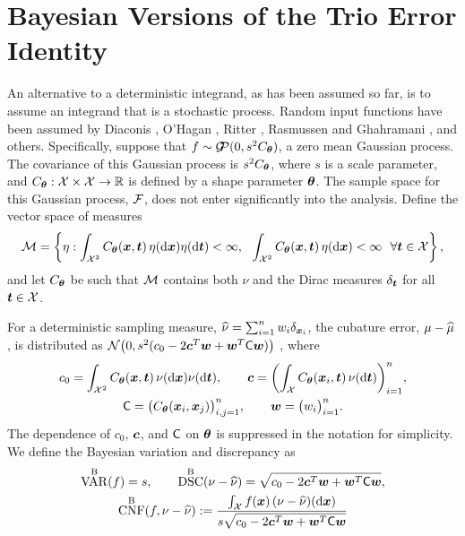 \documentclass[graybox,footinfo]{svmult}
\DeclareMathOperator{\algn}{CNF}
\DeclareMathOperator{\disc}{DSC}
\DeclareMathOperator{\Var}{VAR}
\DeclareMathOperator{\GP}{\cg\!\!\cp}
\begin{document}
\section{Bayesian Versions of the Trio Error Identity}
An alternative to a deterministic integrand, as has been assumed so far, is to assume an 
integrand that is a stochastic process.  Random input functions have been assumed by 
Diaconis \cite{Dia88a}, O'Hagan \cite{OHa91a}, Ritter \cite{Rit00a}, Rasmussen and 
Ghahramani \cite{RasGha03a}, and others. Specifically, suppose that $f \sim \GP (0, 
s^2C_{\bstheta})$, a zero mean Gaussian process.  The covariance of 
this  Gaussian process is $s^2C_{{\boldsymbol{\theta}}}$, where $s$ is a scale parameter, and 
$C_{{\boldsymbol{\theta}}}:\mathcal{X} \times \mathcal{X} \to {\mathbb{R}}$ is defined by a shape parameter ${\boldsymbol{\theta}}$.  The 
sample space for this Gaussian process, ${\mathcal{F}}$, does not enter significantly into the 
analysis.  Define the vector space of measures 
\begin{equation*}
\mathcal{M} = \left\{\eta :  \int_{{\mathcal{X}}^2} C_{\boldsymbol{\theta}}({\boldsymbol{x}},{\boldsymbol{t}}) 
\, \eta(\mathrm{d} {\boldsymbol{x}}) \eta(\mathrm{d} {\boldsymbol{t}}) < \infty, \ \ \int_{{\mathcal{X}}^2} C_{\boldsymbol{\theta}}({\boldsymbol{x}},{\boldsymbol{t}}) 
\, \eta(\mathrm{d} {\boldsymbol{x}}) < \infty \ \ \forall {\boldsymbol{t}} \in \mathcal{X} \right \},
\end{equation*}
and let $C_{{\boldsymbol{\theta}}}$ be such that $\mathcal{M}$ contains both $\nu$ and the Dirac measures 
$\delta_{{\boldsymbol{t}}}$ for all ${\boldsymbol{t}} \in \mathcal{X}$. 

For a 
deterministic sampling measure, $\widehat{\nu} = \sum_{i=1}^n w_i \delta_{{\boldsymbol{x}}_i}$, the cubature 
error, $\mu - \widehat{\mu}$, is distributed as $\mathcal{N} \bigl(0 , s^2(c_0 - 
2 {\boldsymbol{c}}^T {\boldsymbol{w}} + {\boldsymbol{w}} ^T \mathsf{C} {\boldsymbol{w}}) \bigr)$ \cite{??}, where 
\begin{gather*}
c_0  = \int_{{\mathcal{X}}^2} C_{\boldsymbol{\theta}}({\boldsymbol{x}},{\boldsymbol{t}}) \, \nu(\mathrm{d} {\boldsymbol{x}}) \nu(\mathrm{d} {\boldsymbol{t}}), \qquad {\boldsymbol{c}} = 
\biggl( 
\int_{\mathcal{X}} 
C_{\boldsymbol{\theta}}({\boldsymbol{x}}_i,{\boldsymbol{t}}) \,\nu(\mathrm{d} {\boldsymbol{t}}) \biggr)_{i=1}^n, \\
\mathsf{C}  = \bigl( C_{\boldsymbol{\theta}}({\boldsymbol{x}}_i,{\boldsymbol{x}}_j) \bigr)_{i,j=1}^n, \qquad {\boldsymbol{w}} = \bigl(w_i 
\bigr)_{i=1}^n.
\end{gather*}
The dependence of $c_0$, ${\boldsymbol{c}}$, and $\mathsf{C}$ on ${\boldsymbol{\theta}}$ is suppressed in the 
notation for simplicity. We 
define the Bayesian variation and discrepancy as 
\begin{subequations} \label{FJH:eq:btriodef}
\begin{gather}
\label{FJH:eq:btriodefa}
\Var^{\Ba}(f)  = s, \qquad \disc^{\Ba}(\nu - \hnu) = \sqrt{c_0 - 
	2 \bsc^T \bsw + \bsw ^T \mC \bsw},\\
\algn^{\Ba}(f,\nu - \hnu) :=\frac{ \int_{\cx} 
	f(\bsx) \, (\nu - \hnu)(\D\bsx)}{s \sqrt{c_0 - 2 \bsc^T \bsw + \bsw ^T \mC \bsw}}
\end{gather}
\end{subequations}
\end{document}
